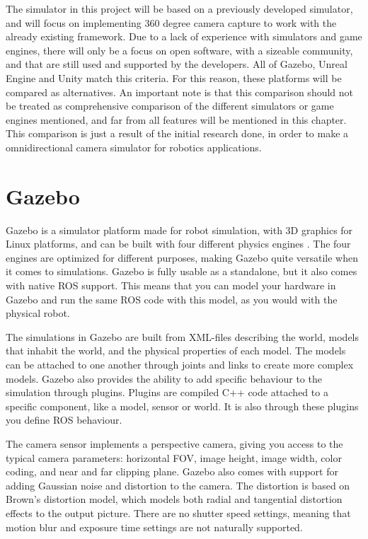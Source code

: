 The simulator in this project will be based on a previously developed simulator, and will focus on implementing 360 degree camera capture to work with the already existing framework. Due to a lack of experience with simulators and game engines, there will only be a focus on open software, with a sizeable community, and that are still used and supported by the developers. All of Gazebo, Unreal Engine and Unity match this criteria. For this reason, these platforms will be compared as alternatives. An important note is that this comparison should not be treated as comprehensive comparison of the different simulators or game engines mentioned, and far from all features will be mentioned in this chapter. This comparison is just a result of the initial research done, in order to make a omnidirectional camera simulator for robotics applications.

\section{Gazebo} \label{sec:Gazebo}

Gazebo is a simulator platform made for robot simulation, with 3D graphics for Linux platforms, and can be built with four different physics engines \cite{Gazebo_phys}. The four engines are optimized for different purposes, making Gazebo quite versatile when it comes to simulations. Gazebo is fully usable as a standalone, but it also comes with native ROS support. This means that you can model your hardware in Gazebo and run the same ROS code with this model, as you would with the physical robot.

The simulations in Gazebo are built from XML-files describing the world, models that inhabit the world, and the physical properties of each model. The models can be attached to one another through joints and links to create more complex models. Gazebo also provides the ability to add specific behaviour to the simulation through plugins. Plugins are compiled C++ code attached to a specific component, like a model, sensor or world. It is also through these plugins you define ROS behaviour.

The camera sensor implements a perspective camera, giving you access to the typical camera parameters: horizontal FOV, image height, image width, color coding, and near and far clipping plane. Gazebo also comes with support for adding Gaussian noise and distortion to the camera. The distortion is based on Brown's distortion model\cite{BrownModel}, which models both radial and tangential distortion effects to the output picture. There are no shutter speed settings, meaning that motion blur and exposure time settings are not naturally supported.

